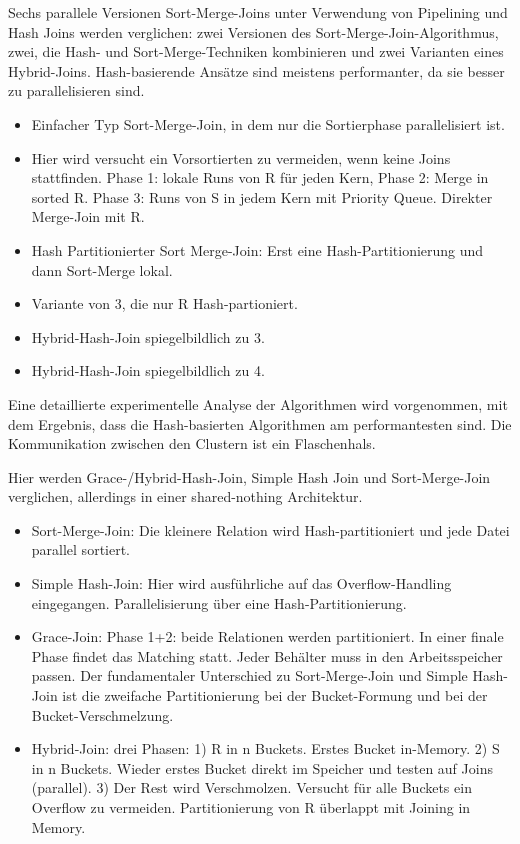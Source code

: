\documentclass[a4paper,12pt,twoside]{article}
\begin{document}
\textbf{}

Sechs parallele Versionen Sort-Merge-Joins unter Verwendung von Pipelining und Hash Joins werden verglichen: zwei Versionen des Sort-Merge-Join-Algorithmus, zwei, die Hash- und Sort-Merge-Techniken kombinieren und zwei Varianten eines Hybrid-Joins. Hash-basierende Ansätze sind meistens performanter, da sie besser zu parallelisieren sind.

\begin{itemize}
	\item Einfacher Typ Sort-Merge-Join, in dem nur die Sortierphase parallelisiert ist.
	\item Hier wird versucht ein Vorsortierten zu vermeiden, wenn keine Joins stattfinden. Phase 1: lokale Runs von R für jeden Kern, Phase 2: Merge in sorted R. Phase 3: Runs von S in jedem Kern mit Priority Queue. Direkter Merge-Join mit R.
	\item Hash Partitionierter Sort Merge-Join: Erst eine Hash-Partitionierung und dann Sort-Merge lokal.
	\item Variante von 3, die nur R Hash-partioniert.
	\item Hybrid-Hash-Join spiegelbildlich zu 3.
	\item Hybrid-Hash-Join spiegelbildlich zu 4.
\end{itemize}

Eine detaillierte experimentelle Analyse der Algorithmen wird vorgenommen, mit dem Ergebnis, dass die Hash-basierten Algorithmen am performantesten sind. Die Kommunikation zwischen den Clustern ist ein Flaschenhals.

\textbf{}

Hier werden Grace-/Hybrid-Hash-Join, Simple Hash Join und Sort-Merge-Join verglichen, allerdings in einer shared-nothing Architektur.

\begin{itemize}
	\item Sort-Merge-Join: Die kleinere Relation wird Hash-partitioniert und jede Datei parallel sortiert. 
	\item Simple Hash-Join: Hier wird ausführliche auf das Overflow-Handling eingegangen. Parallelisierung über eine Hash-Partitionierung.
	\item Grace-Join: Phase 1+2: beide Relationen werden partitioniert. In einer finale Phase findet das Matching statt. Jeder Behälter muss in den Arbeitsspeicher passen. Der fundamentaler Unterschied zu Sort-Merge-Join und Simple Hash-Join ist die zweifache Partitionierung bei der Bucket-Formung und bei der Bucket-Verschmelzung.
	\item Hybrid-Join: drei Phasen: 1) R in n Buckets. Erstes Bucket in-Memory. 2) S in n Buckets. Wieder erstes Bucket direkt im Speicher und testen auf Joins (parallel). 3) Der Rest wird Verschmolzen. Versucht für alle Buckets ein Overflow zu vermeiden. Partitionierung von R überlappt mit Joining in Memory.
\end{itemize}
\end{document}
